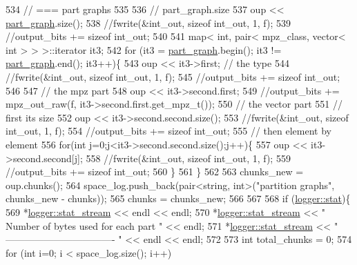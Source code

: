 \begin{DoxyCode}
534   \textcolor{comment}{// === part graphs}
535 
536   \textcolor{comment}{// part\_graph.size}
537   oup <<  \hyperlink{classmarked__graph__compressed_ae179a4737e6eab905c18a94d44ef64b7}{part\_graph}.size();
538   \textcolor{comment}{//fwrite(&int\_out, sizeof int\_out, 1, f);}
539   \textcolor{comment}{//output\_bits += sizeof int\_out;}
540 
541   map< int, pair< mpz\_class, vector< int > > >::iterator it3;
542   \textcolor{keywordflow}{for} (it3 = \hyperlink{classmarked__graph__compressed_ae179a4737e6eab905c18a94d44ef64b7}{part\_graph}.begin(); it3 != \hyperlink{classmarked__graph__compressed_ae179a4737e6eab905c18a94d44ef64b7}{part\_graph}.end(); it3++)\{
543     oup <<  it3->first; \textcolor{comment}{// the type}
544     \textcolor{comment}{//fwrite(&int\_out, sizeof int\_out, 1, f);}
545     \textcolor{comment}{//output\_bits += sizeof int\_out;}
546 
547     \textcolor{comment}{// the mpz part}
548     oup << it3->second.first;
549     \textcolor{comment}{//output\_bits += mpz\_out\_raw(f, it3->second.first.get\_mpz\_t());}
550     \textcolor{comment}{// the vector part}
551     \textcolor{comment}{// first its size}
552     oup <<  it3->second.second.size();
553     \textcolor{comment}{//fwrite(&int\_out, sizeof int\_out, 1, f);}
554     \textcolor{comment}{//output\_bits += sizeof int\_out;}
555     \textcolor{comment}{// then element by element}
556     \textcolor{keywordflow}{for}(\textcolor{keywordtype}{int} j=0;j<it3->second.second.size();j++)\{
557       oup <<  it3->second.second[j];
558       \textcolor{comment}{//fwrite(&int\_out, sizeof int\_out, 1, f);}
559       \textcolor{comment}{//output\_bits += sizeof int\_out;}
560     \}
561   \}
562 
563   chunks\_new = oup.chunks();
564   space\_log.push\_back(pair<string, int>(\textcolor{stringliteral}{"partition graphs"}, chunks\_new - chunks));
565   chunks = chunks\_new;
566 
567   
568   \textcolor{keywordflow}{if} (\hyperlink{classlogger_a26812b5ba03f130e8dae3446d5fc032f}{logger::stat})\{
569     *\hyperlink{classlogger_a7db37821f875f2ba3540980b355779f5}{logger::stat\_stream} << endl << endl;
570     *\hyperlink{classlogger_a7db37821f875f2ba3540980b355779f5}{logger::stat\_stream} << \textcolor{stringliteral}{" Number of bytes used for each part "} << endl;
571     *\hyperlink{classlogger_a7db37821f875f2ba3540980b355779f5}{logger::stat\_stream} << \textcolor{stringliteral}{" ---------------------------------- "} << endl << endl;
572 
573     \textcolor{keywordtype}{int} total\_chunks = 0;
574     \textcolor{keywordflow}{for} (\textcolor{keywordtype}{int} i=0; i < space\_log.size(); i++)

\end{DoxyCode}
